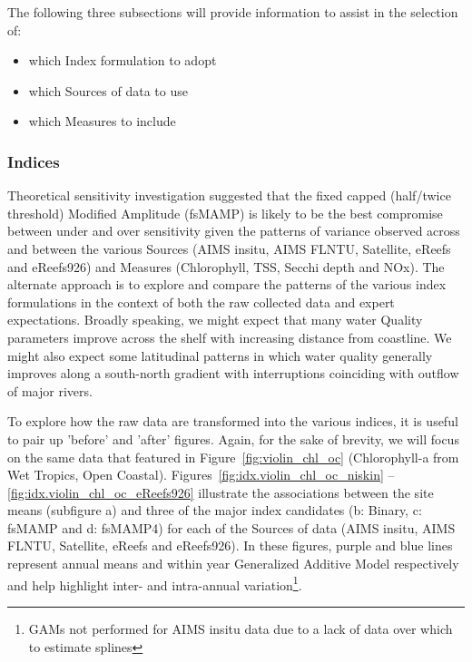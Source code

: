 The following three subsections will provide information to assist in the selection of:
\begin{itemize}
\item which Index formulation to adopt
\item which Sources of data to use
\item which Measures to include
\end{itemize}


\subsubsection{Indices}

Theoretical sensitivity investigation suggested that the fixed capped (half/twice threshold)
Modified Amplitude (fsMAMP) is likely to be the best compromise between under and over sensitivity
given the patterns of variance observed across and between the various Sources (AIMS insitu, AIMS
FLNTU, Satellite, eReefs and eReefs926) and Measures (Chlorophyll, TSS, Secchi depth and NOx).  The
alternate approach is to explore and compare the patterns of the various index formulations in the
context of both the raw collected data and expert expectations.  Broadly speaking, we might expect
that many water Quality parameters improve across the shelf with increasing distance from coastline.
We might also expect some latitudinal patterns in which water quality generally improves along a
south-north gradient with interruptions coinciding with outflow of major rivers.


To explore how the raw data are transformed into the various indices, it is useful to pair up
'before' and 'after' figures.  Again, for the sake of brevity, we will focus on the same data that
featured in Figure~\ref{fig:violin_chl_oc} (Chlorophyll-a from Wet Tropics, Open Coastal).
Figures~\ref{fig:idx.violin_chl_oc_niskin} -- \ref{fig:idx.violin_chl_oc_eReefs926} illustrate the
associations between the site means (subfigure a) and three of the major index candidates (b:
Binary, c: fsMAMP and d: fsMAMP4) for each of the Sources of data (AIMS insitu, AIMS FLNTU,
Satellite, eReefs and eReefs926).  In these figures, purple and blue lines represent annual means
and within year Generalized Additive Model \citep[][]{Wood-2006-2006} respectively and help
highlight inter- and intra-annual variation\footnote{GAMs not performed for AIMS insitu data due to
a lack of data over which to estimate splines}.

